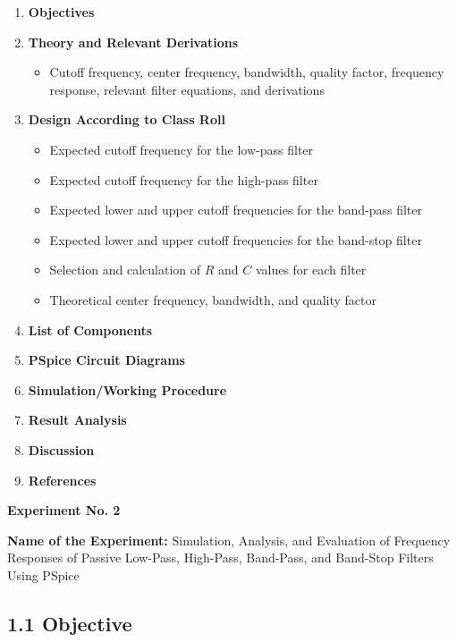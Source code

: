 \documentclass[12pt,a4paper]{article}
\begin{document}
\begin{enumerate}[leftmargin=0.75cm,label=\arabic*.,itemsep=0.35em]
  \item \textbf{Objectives}

  \item \textbf{Theory and Relevant Derivations}
  \begin{itemize}[label=$\checkmark$,leftmargin=1cm,itemsep=0pt,topsep=0.2em]
    \item Cutoff frequency, center frequency, bandwidth, quality factor, frequency response, relevant filter equations, and derivations
  \end{itemize}

  \item \textbf{Design According to Class Roll}
  \begin{itemize}[label=$\checkmark$,leftmargin=1cm,itemsep=0.15em,topsep=0.2em]
    \item Expected cutoff frequency for the low-pass filter
    \item Expected cutoff frequency for the high-pass filter
    \item Expected lower and upper cutoff frequencies for the band-pass filter
    \item Expected lower and upper cutoff frequencies for the band-stop filter
    \item Selection and calculation of $R$ and $C$ values for each filter
    \item Theoretical center frequency, bandwidth, and quality factor
  \end{itemize}

  \item \textbf{List of Components}
  \item \textbf{PSpice Circuit Diagrams}
  \item \textbf{Simulation/Working Procedure}
  \item \textbf{Result Analysis}
  \item \textbf{Discussion}
  \item \textbf{References}
\end{enumerate}

\newpage

\textbf{Experiment No. 2}

\textbf{Name of the Experiment:} Simulation, Analysis, and Evaluation of Frequency Responses of Passive Low-Pass, High-Pass, Band-Pass, and Band-Stop Filters Using PSpice

\subsection*{1.1 Objective}
\end{document}
